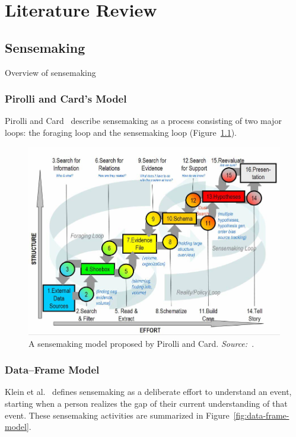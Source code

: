 \chapter{Literature Review}

\graphicspath{{Chapter2/figures/}}

%
%
%
%
%

\section{Sensemaking}
Overview of sensemaking

\subsection{Pirolli and Card's Model}
Pirolli and Card~\cite{Pirolli2005} describe sensemaking as a process consisting of two major loops: the foraging loop and the sensemaking loop (Figure~\ref{fig:pirolli-card-model}). 

\begin{figure}[!htb]
	\centering
	\includegraphics[width=.8\columnwidth]{pirolli-card-model}
	\caption{A sensemaking model proposed by Pirolli and Card. \emph{Source:~\cite{Pirolli2005}}.}
	\label{fig:pirolli-card-model}
\end{figure}

\subsection{Data--Frame Model}
Klein et al.~\cite{Klein2003} defines sensemaking as a deliberate effort to understand an event, starting when a person realizes the gap of their current understanding of that event. These sensemaking activities are summarized in Figure~\ref{fig:data-frame-model}. 

